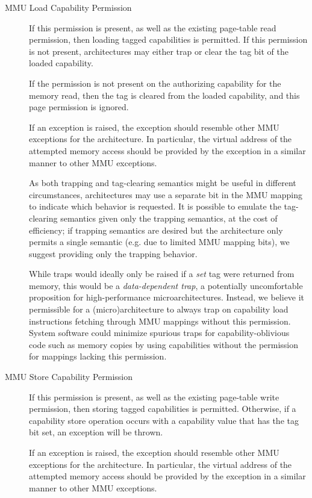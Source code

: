 \begin{description}
\item[MMU Load Capability Permission]
If this permission is present, as well as the existing page-table read
permission, then loading tagged capabilities is permitted.
If this permission is not present, architectures may either trap or
clear the tag bit of the loaded capability.

If the \cappermLC permission is not present on the authorizing capability for
the memory read, then the tag is cleared from the loaded capability, and this
page permission is ignored.

If an exception is raised, the exception should resemble other MMU
exceptions for the architecture.  In particular, the virtual address
of the attempted memory access should be provided by the exception in
a similar manner to other MMU exceptions.

As both trapping and tag-clearing semantics might be useful in different
circumstances, architectures may use a separate
bit in the MMU mapping to indicate which behavior is requested.
It is possible to emulate the tag-clearing semantics given only the trapping
semantics, at the cost of efficiency; if trapping semantics are
desired but the architecture only permits a single semantic (e.g. due
to limited MMU mapping bits), we suggest providing only the trapping behavior.

While traps would ideally only be
raised if a \emph{set} tag were returned from memory, this would be a
\emph{data-dependent trap}, a potentially uncomfortable proposition for
high-performance microarchitectures.  Instead, we believe it permissible for a
(micro)architecture to always trap on capability load instructions fetching
through MMU mappings without this permission.  System software could
minimize spurious traps for capability-oblivious code such as memory
copies by using capabilities without the \cappermLC permission for
mappings lacking this permission.

\item[MMU Store Capability Permission]
If this permission is present, as well as the existing page-table write
permission, then storing tagged capabilities is permitted.
Otherwise, if a capability store operation occurs with a capability value that
has the tag bit set, an exception will be thrown.

If an exception is raised, the exception should resemble other MMU
exceptions for the architecture.  In particular, the virtual address
of the attempted memory access should be provided by the exception in
a similar manner to other MMU exceptions.


\end{description}
